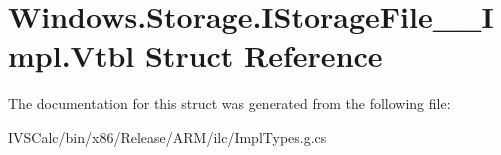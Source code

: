 \hypertarget{struct_windows_1_1_storage_1_1_i_storage_file_____impl_1_1_vtbl}{}\section{Windows.\+Storage.\+I\+Storage\+File\+\_\+\+\_\+\+Impl.\+Vtbl Struct Reference}
\label{struct_windows_1_1_storage_1_1_i_storage_file_____impl_1_1_vtbl}


The documentation for this struct was generated from the following file\+:\begin{DoxyCompactItemize}
\item 
I\+V\+S\+Calc/bin/x86/\+Release/\+A\+R\+M/ilc/Impl\+Types.\+g.\+cs\end{DoxyCompactItemize}

